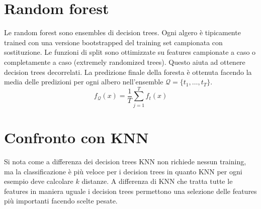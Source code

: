 \section{Random forest}
Le random forest sono ensembles di decision trees.
Ogni algero \`e tipicamente trained con una versione bootstrapped del training set campionata con sostituzione.
Le funzioni di split sono ottimizzate su features campionate a caso o completamente a caso (extremely randomized trees).
Questo aiuta ad ottenere decision trees decorrelati.
La predizione finale della foresta \`e ottenuta facendo la media delle predizioni per ogni albero nell'ensemble $\mathcal{Q}=\{t_1,\dots,t_T\}$.
$$f_\mathcal{Q}(x)=\dfrac{1}{T}\sum\limits_{j=1}^Tf_t(x)$$

\section{Confronto con KNN}
Si nota come a differenza dei decision trees KNN non richiede nessun training, ma la classificazione \`e pi\`u veloce per i decision trees in quanto KNN per ogni esempio deve calcolare $k$ distanze.
A differenza di KNN che tratta tutte le features in maniera uguale i decision trees permettono una selezione delle features pi\`u importanti facendo scelte pesate.

